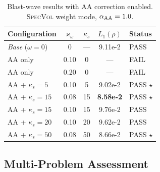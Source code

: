 \documentclass[twocolumn]{aastex63}
\begin{document}
\begin{table}[h!]
\caption{Blast-wave results with AA correction enabled.
  \textsc{SpecVol} weight mode, $\alpha_{\rm AA}=1.0$.}
\label{tab:blast_aa}
\centering
\begin{tabular}{lcccl}
\toprule
Configuration & $\varkappa_\omega$ & $\kappa_s$ & $L_1(\rho)$ & Status \\
\midrule
\textit{Base} ($\omega=0$)  & 0    & --- & 9.11e-2 & PASS \\
AA only              & 0.10 & 0   & ---      & FAIL \\
AA only              & 0.20 & 0   & ---      & FAIL \\
AA + $\kappa_s=5$    & 0.10 & 5   & 9.02e-2  & PASS $\star$ \\
AA + $\kappa_s=15$   & 0.08 & 15  & \textbf{8.58e-2}  & PASS $\star$ \\
AA + $\kappa_s=15$   & 0.10 & 15  & 9.76e-2  & PASS \\
AA + $\kappa_s=20$   & 0.10 & 20  & 9.62e-2  & PASS \\
AA + $\kappa_s=50$   & 0.08 & 50  & 8.66e-2  & PASS $\star$ \\
\bottomrule
\end{tabular}
\end{table}

\subsection{Multi-Problem Assessment}
\end{document}
